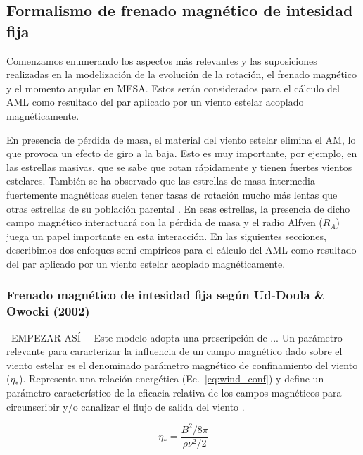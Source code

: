 \subsection{Formalismo de frenado magnético de intesidad fija} \label{mod_mb}
Comenzamos enumerando los aspectos más relevantes y las suposiciones realizadas en la modelización de la evolución de la rotación, el frenado magnético y el momento angular en MESA. Estos serán considerados para el cálculo del AML como resultado del par aplicado por un viento estelar acoplado magnéticamente.\par 

En presencia de pérdida de masa, el material del viento estelar elimina el AM, lo que provoca un efecto de giro a la baja. Esto es muy importante, por ejemplo, en las estrellas masivas, que se sabe que rotan rápidamente y tienen fuertes vientos estelares. También se ha observado que las estrellas de masa intermedia fuertemente magnéticas suelen tener tasas de rotación mucho más lentas que otras estrellas de su población parental \citep{Mathys2006}. En esas estrellas, la presencia de dicho campo magnético interactuará con la pérdida de masa y el radio Alfven ($R_{A}$) juega un papel importante en esta interacción. En las siguientes secciones, describimos dos enfoques semi-empíricos para el cálculo del AML como resultado del par aplicado por un viento estelar acoplado magnéticamente.\par

\subsubsection{Frenado magnético de intesidad fija según Ud-Doula \& Owocki (2002)}
--EMPEZAR ASÍ---
Este modelo adopta una prescripción de ...
Un parámetro relevante para caracterizar la influencia de un campo magnético dado sobre el viento estelar es el denominado parámetro magnético de confinamiento del viento ($\eta_*$). Representa una relación energética (Ec.~\ref{eq:wind_conf}) y define un parámetro característico de la eficacia relativa de los campos magnéticos para circunscribir y/o canalizar el flujo de salida del viento \cite{UdDoula2002}.\par

\begin{ceqn}
\begin{equation}
    \eta_* = \frac{B^{2}/8\pi}{\rho\nu^2/2} \label{eq:wind_conf}
\end{equation}
\end{ceqn}

